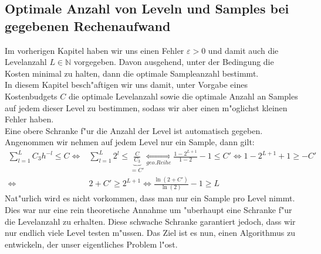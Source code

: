 \subsection{Optimale Anzahl von Leveln und Samples bei gegebenen Rechenaufwand}
Im vorherigen Kapitel haben wir uns einen Fehler $\varepsilon>0$ und damit auch die Levelanzahl $L\in\mathbb{N}$ vorgegeben. Davon ausgehend, unter der Bedingung die Kosten minimal zu halten, dann die optimale Sampleanzahl bestimmt.\\
In diesem Kapitel besch"aftigen wir uns damit, unter Vorgabe eines Kostenbudgets $C$ die optimale Levelanzahl sowie die optimale Anzahl an Samples auf jedem dieser Level zu bestimmen, sodass wir aber einen m"oglichst kleinen Fehler haben.\\[0,2cm]

Eine obere Schranke f"ur die Anzahl der Level ist automatisch gegeben.
Angenommen wir nehmen auf jedem Level nur ein Sample, dann gilt:
\begin{align}
\sum_{l=1}^L C_3 h^{-l} \leq C \Leftrightarrow& \sum_{l=1}^L 2^l \leq \underbrace{\frac{C}{C_3}}_{=C'} \underset{geo. Reihe}{\Leftrightarrow} \frac{1-2^{L+1}}{1-2}-1\leq C' 
\Leftrightarrow 1-2^{L+1}+1 \geq -C'\\
 \Leftrightarrow & 2+C' \geq 2^{L+1} \Leftrightarrow \frac{\ln(2+C')}{\ln(2)}-1\geq L 
\end{align}
Nat"urlich wird es nicht vorkommen, dass man nur ein Sample pro Level nimmt. Dies war nur eine rein theoretische Annahme um "uberhaupt eine Schranke f"ur die Levelanzahl zu erhalten. Diese schwache Schranke garantiert jedoch, dass wir nur endlich viele Level testen m"ussen.
Das Ziel ist es nun, einen Algorithmus zu entwickeln, der unser eigentliches Problem l"ost.\\[0,1cm]

